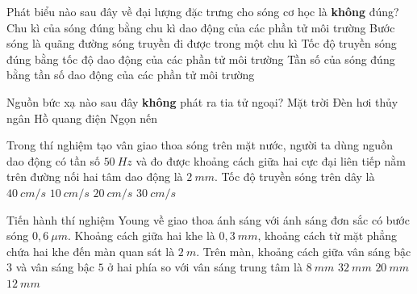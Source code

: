 	\begin{ex}%
		Phát biểu nào sau đây về đại lượng đặc trưng cho sóng cơ học là \textbf{không} đúng?
		\choice
		{Chu kì của sóng đúng bằng chu kì dao động của các phần tử môi trường}
		{Bước sóng là quãng đường sóng truyền đi được trong một chu kì}
		{\True Tốc độ truyền sóng đúng bằng tốc độ dao động của các phần tử môi trường}
		{Tần số của sóng đúng bằng tần số dao động của các phần tử môi trường}
	\end{ex}
	\begin{ex}%
		Nguồn bức xạ nào sau đây \textbf{không} phát ra tia tử ngoại?	
		\choice
		{Mặt trời}
		{Đèn hơi thủy ngân}
		{Hồ quang điện}
		{\True Ngọn nến}	
	\end{ex}
	\begin{ex}%
		Trong thí nghiệm tạo vân giao thoa sóng trên mặt nước, người ta dùng nguồn dao động có tần số $50\ Hz$ và đo được khoảng cách giữa hai cực đại liên tiếp nằm trên đường nối hai tâm dao động là $2\ mm$. Tốc độ truyền sóng trên dây là
		\choice
		{$40\ cm/s$}
		{$10\ cm/s$}
		{\True $20\ cm/s$}
		{$30\ cm/s$}
	\end{ex}
	\begin{ex}%
		Tiến hành thí nghiệm Young về giao thoa ánh sáng với ánh sáng đơn sắc có bước sóng $0,6\ \mu m$. Khoảng cách giữa hai khe là $0,3\ mm$, khoảng cách từ mặt phẳng chứa hai khe đến màn quan sát là $2\ m$. Trên màn, khoảng cách giữa vân sáng bậc $3$ và vân sáng bậc $5$ ở hai phía so với vân sáng trung tâm là
		\choice
		{$8\ mm$}
		{\True $32\ mm$}
		{$20\ mm$}
		{$12\ mm$}
	\end{ex}
